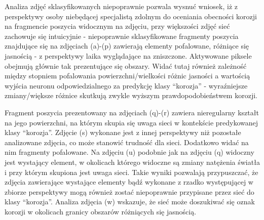 \documentclass[polish,12pt]{aghthesis}
\begin{document}
\par Analiza zdjęć sklasyfikowanych niepoprawnie pozwala wysnuć wniosek, iż z perspektywy osoby niebędącej specjalistą zdolnym do oceniania obecności korozji na fragmencie poszycia widocznym na zdjęciu, przy większości zdjęć sieć zachowuje się intuicyjnie - niepoprawnie sklasyfikowane fragmenty poszycia znajdujące się na zdjęciach (a)-(p) zawierają elementy pofalowane, różniące się jasnością - z perspektywy laika wyglądające na zniszczone. Aktywowane piksele obejmują głównie tak prezentujące się obszary. Widać tutaj również zależność między stopniem pofalowania powierzchni/wielkości różnic jasności a wartością wyjścia neuronu odpowiedzialnego za predykcję klasy ``korozja'' - wyraźniejsze zmiany/większe różnice skutkują zwykle wyższym prawdopodobieństwem korozji.
\par Fragment poszycia prezentowany na zdjęciach (q)-(r) zawiera nieregularny kształt na jego powierzchni, na którym skupia się uwaga sieci w kontekście predykowanej klasy ``korozja''. Zdjęcie (s) wykonane jest z innej perspektywy niż pozostałe analizowane zdjęcia, co może stanowić trudność dla sieci. Dodatkowo widać na nim fragmenty pofalowane. Na zdjęciu (u) podobnie jak na zdjęciu (q) widoczny jest wystający element, w okolicach którego widoczne są zmiany natężenia światła i przy którym skupiona jest uwaga sieci. Takie wyniki pozwalają przypuszczać, że zdjęcia zawierające wystające elementy bądź wykonane z rzadko występującej w zbiorze perspektywy mogą również zostać niepoprawnie przypisane przez sieć do klasy ``korozja''. Analiza zdjęcia (w) wskazuje, że sieć może doszukiwać się oznak korozji w okolicach granicy obszarów różniących się jasnością.
\end{document}
